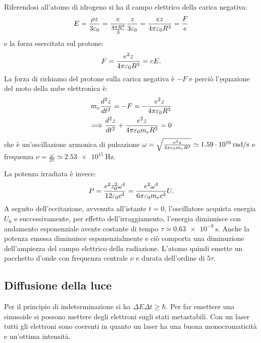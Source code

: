 Riferendosi all'atomo di idrogeno si ha il campo elettrico della carica negativa:
\begin{equation}\begin{split}
E=\frac{\rho z}{3\varepsilon_0}=\frac{e}{\frac{4\pi R^3}{3}}\frac{z}{3\varepsilon_0}=\frac{ez}{4\pi\varepsilon_0R^3}=\frac{F}{e}
\end{split}\end{equation}
e la forza esercitata sul protone:
\begin{equation}\begin{split}
F=\frac{e^2z}{4\pi\varepsilon_0R^3}=eE.
\end{split}\end{equation}
La \b{forza di richiamo del protone} sulla carica negativa è $-F$ e perciò l'\b{equazione del moto della nube elettronica} è:
\begin{equation}\begin{split}
m_e\frac{d^2z}{dt^2}=-F=-\frac{e^2z}{4\pi\varepsilon_0R^3}\\
\Longrightarrow \frac{d^2z}{dt^2}+\frac{e^2z}{4\pi\varepsilon_0m_eR^3}=0
\end{split}\end{equation}
che è un'oscillazione armonica di pulsazione $\omega=\sqrt{\frac{e^2z}{4\pi\varepsilon_0m_eR^3}}\simeq\SI{1.59e16}{rad\per\second}$ e frequenza $\nu=\frac{\omega}{2\pi}\simeq\SI{2.53e15}{\hertz}$.

La potenza irradiata è invece:
\begin{equation}\begin{split}
P=\frac{e^2z_0^2\omega^4}{12\varepsilon_0c^3}=\frac{e^2\omega^4}{6\pi\varepsilon_0m_ec^3}U.
\end{split}\end{equation}
A seguito dell'eccitazione, avvenuta all'istante $t=0$, l'oscillatore acquista energia $U_0$ e successivamente, per effetto dell'irraggiamento, l'energia diminuisce con andamento esponenziale avente costante di tempo $\tau\simeq\SI{0.63e-9}{\second}$. Anche la potenza emessa diminuisce esponenzialmente e ciò comporta una diminuzione dell'ampiezza del campo elettrico della radiazione. L'atomo quindi emette un pacchetto d'onde con frequenza centrale $\nu$ e durata dell'ordine di $5\tau$.

\subsection{Diffusione della luce}
Per il principio di indeterminazione si ha $\Delta E\Delta t\ge\hbar$. Per far emettere una sinusoide si possono mettere degli elettroni sugli stati metastabili. Con un laser tutti gli elettroni sono coerenti in quanto un laser ha una buona monocromaticità e un'ottima intensità.

